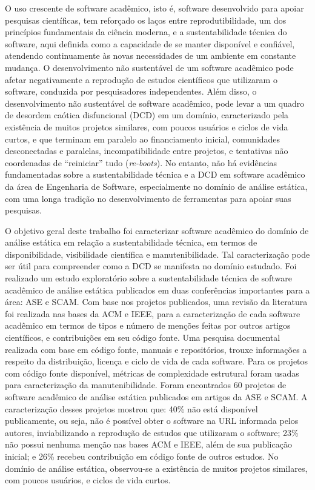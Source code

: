 O uso crescente de software acadêmico, isto é, 
software desenvolvido para apoiar pesquisas científicas,
tem reforçado os laços entre 
reprodutibilidade, um dos princípios fundamentais da ciência moderna,
e a sustentabilidade técnica do software,
aqui definida como a capacidade de se manter disponível e confiável,
atendendo continuamente às novas necessidades de um ambiente em constante mudança.
%
O desenvolvimento não sustentável de um software acadêmico pode 
afetar negativamente a reprodução de estudos científicos que utilizaram o software,
conduzida por pesquisadores independentes. 
Além disso, o desenvolvimento não sustentável de software acadêmico,
pode levar a um quadro de desordem caótica disfuncional (DCD) em um domínio,
caracterizado pela existência de muitos projetos similares, com poucos
usuários e ciclos de vida curtos, e que terminam em paralelo ao financiamento
inicial,  comunidades desconectadas e paralelas, incompatibilidade entre
projetos, e tentativas não coordenadas de ``reiniciar'' tudo
({\it re-boots}).
%
No entanto, não há evidências fundamentadas sobre a sustentabilidade técnica
e a DCD em software acadêmico da área de Engenharia de Software, especialmente
no domínio de análise estática, com uma longa tradição no
desenvolvimento de ferramentas para apoiar suas pesquisas.

O objetivo geral deste trabalho foi 
caracterizar software acadêmico do domínio de análise estática 
em relação a sustentabilidade técnica, 
em termos de disponibilidade, visibilidade científica e manutenibilidade.
Tal caracterização pode ser útil para compreender como a DCD se manifesta
no domínio estudado.
%
Foi realizado um estudo exploratório sobre a sustentabilidade
técnica de software acadêmico de análise estática 
publicados em duas conferências importantes para a área: ASE e SCAM.
%
Com base nos projetos publicados,  %
uma revisão da literatura foi realizada nas bases da ACM e IEEE, 
para a caracterização de cada software acadêmico 
em termos de tipos e número de menções feitas por outros artigos científicos,
e contribuições em seu código fonte.
Uma pesquisa documental realizada com base em 
código fonte, manuais e repositórios, trouxe informações a respeito da
distribuição, licença e ciclo de vida de cada software.
Para os projetos com código fonte disponível, métricas de
complexidade estrutural foram usadas para caracterização da manutenibilidade.
%
Foram encontrados 60 projetos de software acadêmico de análise estática
publicados em artigos da ASE e SCAM.
%
A caracterização desses projetos mostrou que: 
40\% não está disponível publicamente, ou seja, 
não é possível obter o software na URL informada pelos autores, 
inviabilizando a reprodução de estudos que utilizaram o software;
%
23\% não possui nenhuma menção nas bases ACM e IEEE, além de sua publicação inicial; e
26\% recebeu contribuição em código fonte de outros estudos.
No domínio de análise estática, observou-se a existência de muitos projetos similares, com poucos usuários, e ciclos de vida curtos.
%

